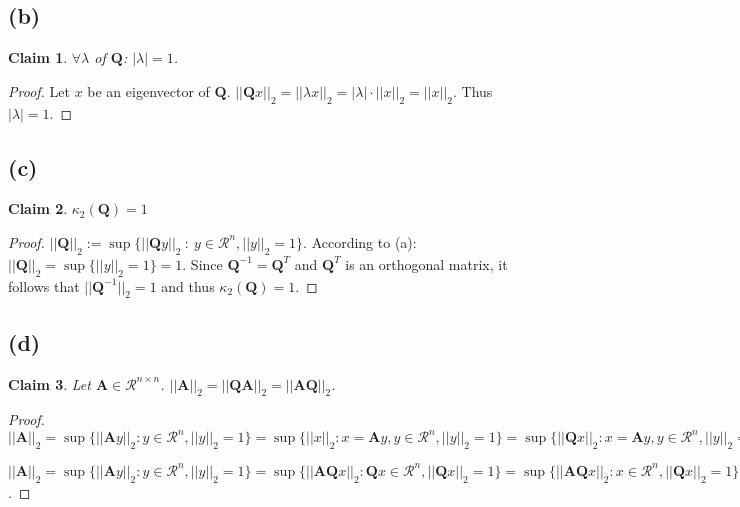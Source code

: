 \documentclass{article}
\newcommand{\norm}[1]{||#1||}
\newtheorem{claim}{Claim}
\begin{document}
	\subsection*{(b)}
		\begin{claim}
			$\forall \lambda$ of $\pmb Q$: $|\lambda|=1$.
		\end{claim}
		\begin{proof}
			Let $x$ be an eigenvector of $\pmb Q$. $\norm{\pmb Qx}_{2} = \norm{\lambda x}_{2} = |\lambda|\cdot\norm{x}_{2}= \norm{x}_{2}$. Thus $|\lambda|=1$.		
		\end{proof}
	\subsection*{(c)}
		\begin{claim}
			$\kappa_{2}(\pmb Q) = 1$
		\end{claim}
		\begin{proof}
			$\norm{\pmb Q}_{2} := \sup\{\norm{\pmb Qy}_{2}\ :\ y\in \mathcal{R}^{n},\norm{y}_{2}=1\}$. According to (a): $\norm{\pmb Q}_{2}= \sup\{\norm{y}_{2}=1\}=1$. Since $\pmb Q^{-1}=\pmb Q^{T}$ and $\pmb Q^{T}$ is an orthogonal matrix, it follows that $\norm{\pmb Q^{-1}}_{2}=1$ and thus $\kappa_{2}(\pmb Q)=1$.
		\end{proof}
	\subsection*{(d)}
		\begin{claim}
			Let $\pmb A \in \mathcal{R}^{n\times n}$. $\norm{\pmb A}_{2} = \norm{\pmb Q\pmb A}_{2} = \norm{\pmb A\pmb Q}_{2}$.
		\end{claim}
		\begin{proof}
			$\norm{\pmb A}_{2} = \sup\{\norm{\pmb Ay}_{2}:y\in \mathcal{R}^{n},\norm{y}_{2}=1\} = \sup\{\norm{x}_{2}: x=\pmb Ay, y\in\mathcal{R}^{n},\norm{y}_{2}=1\}= \sup\{\norm{\pmb Qx}_{2}: x=\pmb Ay, y\in\mathcal{R}^{n},\norm{y}_{2}=1\} = \sup\{\norm{\pmb Q\pmb A y}_{2}: y\in\mathcal{R}^{n},\norm{y}_{2}=1\} = \norm{\pmb Q\pmb A}_{2}$
			
			$\norm{\pmb A}_{2} = \sup\{\norm{\pmb Ay}_{2}:y\in \mathcal{R}^{n}, \norm{y}_{2}=1\} = \sup\{\norm{\pmb A\pmb Q x}_{2}: \pmb Qx\in \mathcal{R}^{n}, \norm{\pmb Qx}_{2}=1\} = \sup\{\norm{\pmb A\pmb Q x}_{2}: x\in \mathcal{R}^{n}, \norm{\pmb Q x}_{2}=1\}=\sup\{\norm{\pmb A \pmb Q x}_{2}: x\in \mathcal{R}^{n},\norm{x}_{2}=1\}=\norm{\pmb A \pmb Q}_{2}$.
		\end{proof}	
\end{document}
